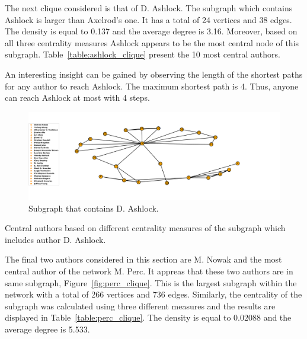 \documentclass{article}
\begin{document}
The next clique considered is that of D. Ashlock. The subgraph which contains
Ashlock is larger than Axelrod's one. It has a total of 24 vertices
and 38 edges. The density is equal to 0.137 and the average degree is 3.16.
Moreover, based on all three centrality measures Ashlock appears to be the most
central node of this subgraph. Table~\ref{table:ashlock_clique} present the 10
most central authors.

An interesting insight can be gained by observing the length of the shortest
paths for any author to reach Ashlock. The maximum shortest path is 4. Thus,
anyone can reach Ashlock at most with 4 steps.

\begin{figure}[!hbtp]
    \centering
    \includegraphics[width=\textwidth]{./assets/images/Ashlock.pdf}
    \caption{Subgraph that contains D. Ashlock.}
    \label{fig:ashlocks_clique}
\end{figure}

\begin{table}[!hbtp]
    \begin{center}
    \scalebox{0.8}{
    
    
    }
    \caption{Central authors based on different centrality measures of the subgraph
    which includes author D. Ashlock.}
    \label{table:ashlock_clique}
    \end{center}
\end{table}

The final two authors considered in this section are M. Nowak and the most central
author of the network M. Perc. It appreas that these two authors are in same
subgraph, Figure~\ref{fig:perc_clique}. This is the largest subgraph within the
network with a total of 266 vertices and 736 edges. Similarly, the centrality
of the subgraph was calculated using three different measures and the results are
displayed in Table~\ref{table:perc_clique}. The density is equal to 0.02088 and the average
degree is 5.533. 
\end{document}
